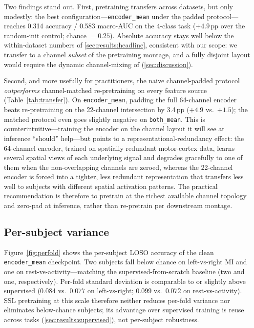 Two findings stand out. First, pretraining transfers across datasets, but
only modestly: the best configuration---\texttt{encoder\_mean} under the
padded protocol---reaches 0.314 accuracy / 0.583 macro-AUC on the 4-class
task ($+4.9$\,pp over the random-init control; chance $=0.25$). Absolute
accuracy stays well below the within-dataset numbers of
\cref{sec:results:headline}, consistent with our scope: we transfer to a
channel \emph{subset} of the pretraining montage, and a fully disjoint
layout would require the dynamic channel-mixing of \cite{laya2026}
(\cref{sec:discussion}).

Second, and more usefully for practitioners, the naive channel-padded
protocol \emph{outperforms} channel-matched re-pretraining on every feature
source (Table~\ref{tab:transfer}). On \texttt{encoder\_mean}, padding the
full 64-channel encoder beats re-pretraining on the 22-channel intersection
by 3.4\,pp ($+4.9$ vs.\ $+1.5$); the matched protocol even goes slightly
negative on \texttt{both\_mean}. This is counterintuitive---training the
encoder on the channel layout it will see at inference ``should'' help---but
points to a representational-redundancy effect: the 64-channel encoder,
trained on spatially redundant motor-cortex data, learns several spatial
views of each underlying signal and degrades gracefully to one of them when
the non-overlapping channels are zeroed, whereas the 22-channel encoder is
forced into a tighter, less redundant representation that transfers less
well to subjects with different spatial activation patterns. The practical
recommendation is therefore to pretrain at the richest available channel
topology and zero-pad at inference, rather than re-pretrain per downstream
montage.

\subsection{Per-subject variance}
\label{sec:results:perfold}

Figure~\ref{fig:perfold} shows the per-subject LOSO accuracy of the clean
\texttt{encoder\_mean} checkpoint. Two subjects fall below chance on
left-vs-right MI and one on rest-vs-activity---matching the
supervised-from-scratch baseline (two and one, respectively). Per-fold
standard deviation is comparable to or slightly above supervised
(0.084 vs.\ 0.077 on left-vs-right; 0.099 vs.\ 0.072 on rest-vs-activity).
SSL pretraining at this scale therefore neither reduces per-fold variance
nor eliminates below-chance subjects; its advantage over supervised
training is reuse across tasks (\cref{sec:results:supervised}), not
per-subject robustness.

